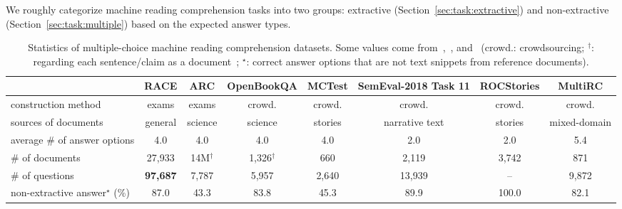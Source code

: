 \documentclass[11pt,a4paper]{article}
\begin{document}
\label{sec:mrc}

We roughly categorize machine reading comprehension tasks into two groups: extractive (Section~\ref{sec:task:extractive}) and non-extractive (Section~\ref{sec:task:multiple}) based on the expected answer types. 


\begin{table*}[htbp!]
\centering
\scriptsize
\begin{tabular}{lccccccc}
\toprule
&\textbf{RACE}   &\textbf{ARC}  &\textbf{OpenBookQA}    &\textbf{MCTest}  &\textbf{SemEval-2018 Task 11} &\textbf{ROCStories} &\textbf{MultiRC}\\
\midrule            
construction method    & exams   & exams      & crowd.     & crowd.    & crowd.    & crowd.  & crowd.            \\
sources of documents   & general & science    & science   &  stories  & narrative text   & stories & mixed-domain    \\
average \# of answer options & 4.0  & 4.0     & 4.0       & 4.0       & 2.0       & 2.0    & 5.4             \\
\# of documents     &  27,933    & 14M$^\dagger$ & 1,326$^\dagger$    & 660       &  2,119   & 3,742 & 871   \\
\# of questions     &  \bf 97,687     & 7,787      & 5,957     & 2,640   &   13,939       &  --  &   9,872           \\

\midrule
non-extractive answer$^\star$ (\%)       & 87.0      & 43.3   & 83.8   & 45.3   &   89.9  &  100.0 & 82.1      \\
\bottomrule
\end{tabular}
\caption{Statistics of multiple-choice machine reading comprehension datasets. Some values come from~,~, and~ (crowd.: crowdsourcing; $^\dagger$: regarding each sentence/claim as a document~\cite{clark2018think}; $^\star$: correct answer options that are not text snippets from reference documents).}
\label{tab:related:answer}
\end{table*}
\end{document}
